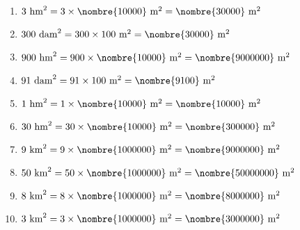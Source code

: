\documentclass[a4paper,11pt,fleqn]{article}
\begin{document}
\begin{correction}
\exo{}

\begin{multicols}{2}
\begin{enumerate}
	\item $ 3~\text{hm}^2 =  3\times\nombre{10000}~\text{m}^2 = \nombre{30000}~\text{m}^2$
	\item $ 300~\text{dam}^2 =  300\times100~\text{m}^2 = \nombre{30000}~\text{m}^2$
	\item $ 900~\text{hm}^2 =  900\times\nombre{10000}~\text{m}^2 = \nombre{9000000}~\text{m}^2$
	\item $ 91~\text{dam}^2 =  91\times100~\text{m}^2 = \nombre{9100}~\text{m}^2$
	\item $ 1~\text{hm}^2 =  1\times\nombre{10000}~\text{m}^2 = \nombre{10000}~\text{m}^2$
	\item $ 30~\text{hm}^2 =  30\times\nombre{10000}~\text{m}^2 = \nombre{300000}~\text{m}^2$
	\item $ 9~\text{km}^2 =  9\times\nombre{1000000}~\text{m}^2 = \nombre{9000000}~\text{m}^2$
	\item $ 50~\text{km}^2 =  50\times\nombre{1000000}~\text{m}^2 = \nombre{50000000}~\text{m}^2$
	\item $ 8~\text{km}^2 =  8\times\nombre{1000000}~\text{m}^2 = \nombre{8000000}~\text{m}^2$
	\item $ 3~\text{km}^2 =  3\times\nombre{1000000}~\text{m}^2 = \nombre{3000000}~\text{m}^2$
\end{enumerate}
\end{multicols}

\exo{}


\end{correction}
\end{document}
